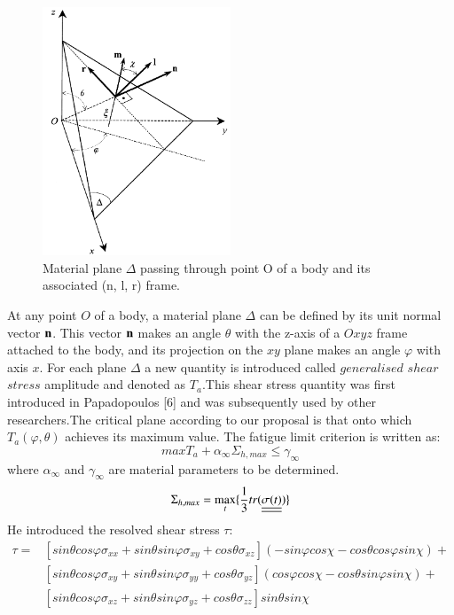 \documentclass[3p,times,procedia,number]{elsarticle}
\begin{document}
         \begin{figure}[h!]
         	\centering
         	\includegraphics[width=0.5\textwidth]{figures//demopp.png} 
         	\caption{Material plane $\Delta$ passing through point O of a body and its
         		associated (n, l, r) frame.}
         	\label{fig50}
         \end{figure}
         At any point $O$ of a body, a material plane $\Delta$ can be defined by its unit normal vector $\bf n$. This vector
         $\bf n$ makes an angle $\theta$ with the z-axis of a $Oxyz$ frame attached to the body, and its projection on the $xy$ plane
         makes an angle $\varphi$ with axis $x$. For each plane $\Delta$ a new quantity is introduced called $generalised$ $shear$ $stress$ amplitude and denoted as $T_a$.This shear stress quantity was first introduced in Papadopoulos [6]
         and was subsequently used by other researchers.The critical plane according to our proposal is that onto which $T_a(\varphi,\theta)$ achieves its maximum value. The fatigue limit criterion is written as:
         \begin{equation}
         	max T_a+\alpha_\infty \Sigma_{h,max}\leqslant \gamma_\infty
         \end{equation}
         where $\alpha_\infty$ and $\gamma_\infty$ are material parameters to be determined\cite{papadopoulos2001long}.
         $$\Sigma_{h,max}=\max\limits_{t}\{\frac{1}{3}tr(\uline{\uline{\sigma(t)}})\}$$
         He introduced the resolved shear stress $\tau$:
         \begin{equation}
         	\begin{split}
         		\tau=&[sin\theta cos\varphi\sigma_{xx}+sin\theta sin\varphi\sigma_{xy}+cos\theta\sigma_{xz}](-sin\varphi cos\chi-cos\theta cos\varphi sin\chi)+\\&[sin\theta cos\varphi\sigma_{xy}+sin\theta sin\varphi\sigma_{yy}+cos\theta\sigma_{yz}](cos\varphi cos\chi-cos\theta sin\varphi sin\chi)+\\&[sin\theta cos\varphi\sigma_{xz}+sin\theta sin\varphi\sigma_{yz}+cos\theta\sigma_{zz}]sin\theta sin\chi
         	\end{split} 
         	\label{eqres}
         \end{equation}
\end{document}
